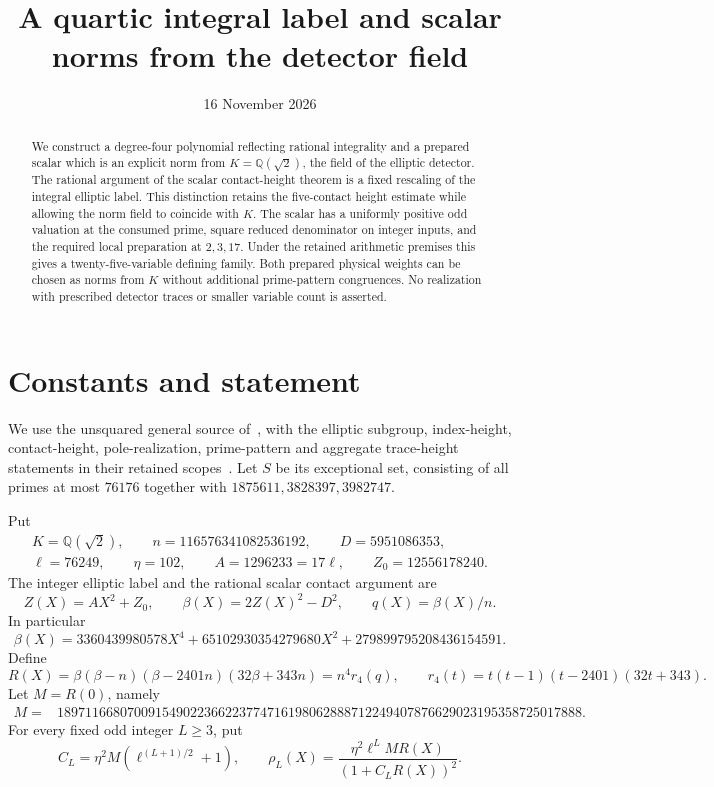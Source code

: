 \documentclass[11pt,a4paper]{article}
\title{A quartic integral label and scalar norms from the detector field}
\author{}\date{16 November 2026}
\newcommand{\Q}{\mathbb Q}\newcommand{\Z}{\mathbb Z}
\begin{document}
\maketitle
\begin{abstract}
We construct a degree-four polynomial reflecting rational integrality
and a prepared scalar which is an explicit norm from
$K=\Q(\sqrt2)$, the field of the elliptic detector. The rational
argument of the scalar contact-height theorem is a fixed rescaling of
the integral elliptic label. This distinction retains the five-contact
height estimate while allowing the norm field to coincide with $K$.
The scalar has a uniformly positive odd valuation at the consumed prime,
square reduced denominator on integer inputs, and the required local
preparation at $2,3,17$. Under the retained arithmetic premises this
gives a twenty-five-variable defining family. Both prepared physical
weights can be chosen as norms from $K$ without additional prime-pattern
congruences. No realization with prescribed detector traces or smaller
variable count is asserted.
\end{abstract}

\section{Constants and statement}
We use the unsquared general source of~\cite{UnitNorm}, with the
elliptic subgroup, index-height, contact-height, pole-realization,
prime-pattern and aggregate trace-height statements in their retained
scopes~\cite{General,Dependencies}. Let $S$ be its exceptional set,
consisting of all primes at most $76176$ together with
$1875611,3828397,3982747$.

Put
\begin{equation}\label{eq:constants}
\begin{gathered}
 K=\Q(\sqrt2),\qquad n=116576341082536192,\qquad D=5951086353,\\
 \ell=76249,\qquad\eta=102,\qquad
 A=1296233=17\ell,\qquad Z_0=12556178240.
\end{gathered}
\end{equation}
The integer elliptic label and the rational scalar contact argument are
\begin{equation}\label{eq:label}
 Z(X)=AX^2+Z_0,\qquad
 \beta(X)=2Z(X)^2-D^2,\qquad q(X)=\beta(X)/n.
\end{equation}
In particular
\[
 \beta(X)=3360439980578X^4+65102930354279680X^2
                              +279899795208436154591.
\]
Define
\begin{equation}\label{eq:contacts}
 R(X)=\beta(\beta-n)(\beta-2401n)(32\beta+343n)
        =n^4r_4(q),\qquad r_4(t)=t(t-1)(t-2401)(32t+343).
\end{equation}
Let $M=R(0)$, namely
\[
\begin{split}
M={}&189711668070091549022366223774716198062888712249407876629023195358725017888.
\end{split}
\]
For every fixed odd integer $L\ge3$, put
\begin{equation}\label{eq:scalar}
 C_L=\eta^2M(\ell^{(L+1)/2}+1),\qquad
 \rho_L(X)=\frac{\eta^2\ell^LMR(X)}{(1+C_LR(X))^2}.
\end{equation}
\end{document}
